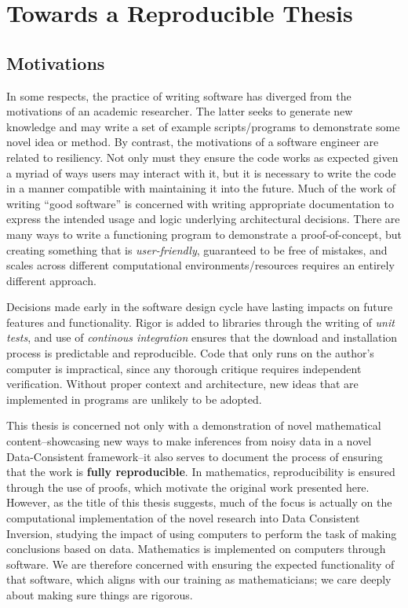 \section{Towards a Reproducible Thesis}\label{sec:reproducibility}

\subsection{Motivations}\label{sec:motivations}
In some respects, the practice of writing software has diverged from the motivations of an academic researcher.
The latter seeks to generate new knowledge and may write a set of example scripts/programs to demonstrate some novel idea or method.
By contrast, the motivations of a software engineer are related to resiliency.
Not only must they ensure the code works as expected given a myriad of ways users may interact with it, but it is necessary to write the code in a manner compatible with maintaining it into the future.
Much of the work of writing ``good software'' is concerned with writing appropriate documentation to express the intended usage and logic underlying architectural decisions.
There are many ways to write a functioning program to demonstrate a proof-of-concept, but creating something that is \emph{user-friendly}, guaranteed to be free of mistakes, and scales across different computational environments/resources requires an entirely different approach.

Decisions made early in the software design cycle have lasting impacts on future features and functionality.
Rigor is added to libraries through the writing of \emph{unit tests}, and use of \emph{continous integration} ensures that the download and installation process is predictable and reproducible.
Code that only runs on the author's computer is impractical, since any thorough critique requires independent verification.
Without proper context and architecture, new ideas that are implemented in programs are unlikely to be adopted.


This thesis is concerned not only with a demonstration of novel mathematical content\---showcasing new ways to make inferences from noisy data in a novel Data-Consistent framework\---it also serves to document the process of ensuring that the work is \textbf{fully reproducible}.
In mathematics, reproducibility is ensured through the use of proofs, which motivate the original work presented here.
However, as the title of this thesis suggests, much of the focus is actually on the computational implementation of the novel research into Data Consistent Inversion, studying the impact of using computers to perform the task of making conclusions based on data.
Mathematics is implemented on computers through software.
We are therefore concerned with ensuring the expected functionality of that software, which aligns with our training as mathematicians; we care deeply about making sure things are rigorous.

